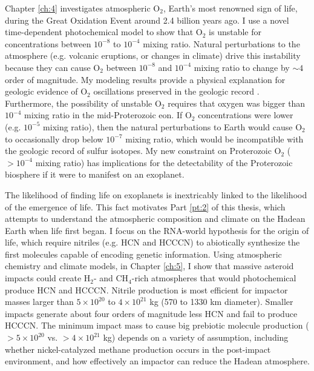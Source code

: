 Chapter \ref{ch:4} investigates atmospheric O$_2$, Earth's most renowned sign of life, during the Great Oxidation Event around 2.4 billion years ago. I use a novel time-dependent photochemical model to show that O$_2$ is unstable for concentrations between $10^{-8}$ to $10^{-4}$ mixing ratio. Natural perturbations to the atmosphere (e.g. volcanic eruptions, or changes in climate) drive this instability because they can cause O$_2$ between $10^{-8}$ and $10^{-4}$ mixing ratio to change by $\sim 4$ order of magnitude. My modeling results provide a physical explanation for geologic evidence of O$_2$ oscillations preserved in the geologic record \citep{Poulton_2021}. Furthermore, the possibility of unstable O$_2$ requires that oxygen was bigger than $10^{-4}$ mixing ratio in the mid-Proterozoic eon. If O$_2$ concentrations were lower (e.g. $10^{-5}$ mixing ratio), then the natural perturbations to Earth would cause O$_2$ to occasionally drop below $10^{-7}$ mixing ratio, which would be incompatible with the geologic record of sulfur isotopes. My new constraint on Proterozoic O$_2$ ($> 10^{-4}$ mixing ratio) has implications for the detectability of the Proterozoic biosphere if it were to manifest on an exoplanet.

The likelihood of finding life on exoplanets is inextricably linked to the likelihood of the emergence of life. This fact motivates Part \ref{pt:2} of this thesis, which attempts to understand the atmospheric composition and climate on the Hadean Earth when life first began. I focus on the RNA-world hypothesis for the origin of life, which require nitriles (e.g. HCN and HCCCN) to abiotically synthesize the first molecules capable of encoding genetic information. Using atmospheric chemistry and climate models, in Chapter \ref{ch:5}, I show that massive asteroid impacts could create H$_2$- and CH$_4$-rich atmospheres that would photochemical produce HCN and HCCCN. Nitrile production is most efficient for impactor masses larger than $5 \times 10^{20}$ to $4 \times 10^{21}$ kg (570 to 1330 km diameter). Smaller impacts generate about four orders of magnitude less HCN and fail to produce HCCCN. The minimum impact mass to cause big prebiotic molecule production ($> 5 \times 10^{20}$ vs. $> 4 \times 10^{21}$ kg) depends on a variety of assumption, including whether nickel-catalyzed methane production occurs in the post-impact environment, and how effectively an impactor can reduce the Hadean atmosphere.

